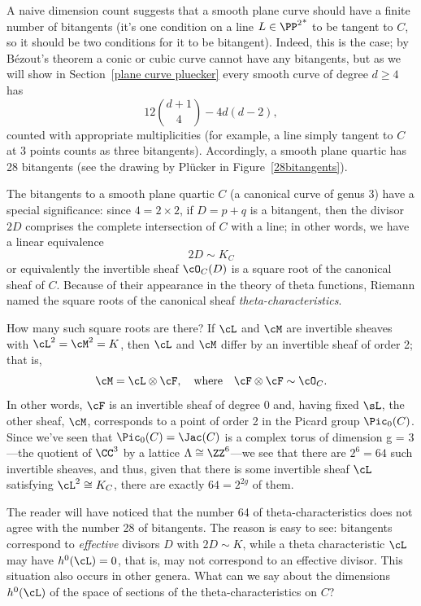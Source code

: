 A naive dimension count suggests that a smooth plane curve should have a finite number of bitangents (it's one condition on a line $L \in {\PP^2}^*$ to be tangent to $C$, so it should be two conditions for it to be bitangent). Indeed, this is the case; by B\'ezout's theorem a conic or cubic curve cannot have any bitangents, but as we will show in Section~\ref{plane curve pluecker} every smooth curve of degree $d \geq 4$ has 
$$
12\binom{d+1}{4} - 4d(d-2),
$$
counted with appropriate multiplicities (for example, a line simply tangent to $C$ at 3 points  counts as three bitangents). Accordingly, a smooth plane quartic has 28 bitangents (see the drawing by Pl\"ucker in Figure~\ref{28bitangents}).

The bitangents to a smooth plane quartic $C$ (a canonical curve of genus 3) have a special significance: since $4 = 2 \times 2$, if $D = p+q$ is a bitangent, then the divisor $2D$ comprises the complete intersection of $C$ with a line; in other words, we have a linear equivalence
$$
2D \sim K_C
$$
or equivalently the invertible sheaf $\cO_C(D)$ is a square root of the canonical sheaf of $C$. Because of their appearance in the theory of theta functions, Riemann named the square roots of the canonical sheaf \emph{theta-characteristics}.

How many such square roots are there? If $\cL$ and $\cM$ are invertible sheaves with $\cL^2 = \cM^2 = K$, then $\cL$ and $\cM$ differ by an invertible sheaf of order 2; that is,
$$
\cM = \cL \otimes \cF, \quad \text{where} \quad \cF \otimes \cF \sim \cO_C.
$$
In other words, $\cF$ is an invertible sheaf of degree 0 and, having fixed $\sL$,  the other sheaf, $\cM$, corresponds to a point of order 2 in the Picard group $\Pic_0(C)$. Since we've seen that $\Pic_0(C) = \Jac(C)$ is a complex torus of dimension g = 3---the quotient of $\CC^3$ by a lattice $\Lambda \cong \ZZ^6$---we see that there are $2^6 = 64$ such invertible sheaves, and thus, given that there is some invertible sheaf $\cL$ satisfying $\cL^2 \cong K_C$, there are exactly $64 = 2^{2g}$ of them.

  
The reader will have noticed that the number 64 of theta-characteristics does not agree with the number 28 of bitangents. The reason is easy to see: bitangents correspond to \emph{effective} divisors $D$ with $2D \sim K$, while a theta characteristic $\cL$ may have $h^0(\cL) = 0$, that is, may not correspond to an effective divisor. 
This situation also occurs in other genera. 
What can we say about the dimensions $h^0(\cL)$ of the space of sections of the theta-characteristics on $C$?
 
